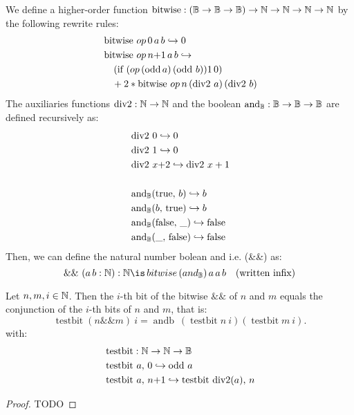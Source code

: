 \begin{definition}
We define a higher-order function \( \mathop{\mathrm{bitwise}} : (\mathbb{B} \rightarrow \mathbb{B} \rightarrow \mathbb{B}) \rightarrow \mathbb{N} \rightarrow \mathbb{N} \rightarrow \mathbb{N} \rightarrow \mathbb{N} \) by the following rewrite rules:
\begin{align*}
&\mathop{\mathrm{bitwise}}\,op\, 0\, a\, b \hookrightarrow 0 \\
&\mathop{\mathrm{bitwise}}\,op\, n{+}1\, a\, b \hookrightarrow \\
&\quad\left( \text{if } (\mathop{op}\,(\mathop{\mathrm{odd}}a)\, (\mathop{\mathrm{odd}}\,b)) 1\,0 \right) \\
&\quad+ 2 * \mathop{\mathrm{bitwise}}\,op\, n\, (\mathop{\mathrm{div2}}\,a)\,(\mathop{\mathrm{div2}}\,b)
\end{align*}
The auxiliaries functions \( \mathop{\mathrm{div2}} : \mathbb{N} \rightarrow \mathbb{N} \) and the boolean \( \mathop{\mathrm{and}_{\mathbb{B}}} : \mathbb{B} \rightarrow \mathbb{B} \rightarrow \mathbb{B} \) are defined recursively as:
\begin{align*}
&\mathop{\mathrm{div2}}\,0 \hookrightarrow 0 \\
&\mathop{\mathrm{div2}}\,1 \hookrightarrow 0 \\
&\mathop{\mathrm{div2}}\,x{+}2 \hookrightarrow \mathop{\mathrm{div2}}\,x + 1 \\
&\\
&\mathop{\mathrm{and}_{\mathbb{B}}}(\mathrm{true},\, b) \hookrightarrow b \\
&\mathop{\mathrm{and}_{\mathbb{B}}}(b,\, \mathrm{true}) \hookrightarrow b \\
&\mathop{\mathrm{and}_{\mathbb{B}}}(\mathrm{false},\, \_) \hookrightarrow \mathrm{false} \\
&\mathop{\mathrm{and}_{\mathbb{B}}}(\_,\, \mathrm{false}) \hookrightarrow \mathrm{false}
\end{align*}
Then, we can define the natural number bolean and i.e. (\&\&) as:
\begin{equation*}
\&\&~(a\,b: \N): \N \is \mathop{bitwise}\,(and_\B)\,a\,a\,b \quad \text{(written infix)}
\end{equation*}
\end{definition}


\begin{lemma}
Let $n, m, i \in \mathbb{N}$. Then the $i$-th bit of the bitwise $\mathbin{\&\&}$ of $n$ and $m$ equals the conjunction of the $i$-th bits of $n$ and $m$, that is:
\[
\mathop{testbit} (n \mathbin{\&\&} m)~i = \mathop{andb}~(\mathop{testbit} n~i) (\mathop{testbit} m~i).
\]
with:
\begin{align*}
&\mathop{\mathrm{testbit}} : \mathbb{N} \rightarrow \mathbb{N} \rightarrow \mathbb{B} \\
&\mathop{\mathrm{testbit}}\,a,\,0 \hookrightarrow \mathop{\mathrm{odd}}\,a \\
&\mathop{\mathrm{testbit}}\,a,\,n{+}1 \hookrightarrow \mathop{\mathrm{testbit}}\,\mathop{\mathrm{div2}}(a),\, n
\end{align*}
\begin{proof}TODO\end{proof}
\label{lem:correct-land}
\end{lemma}

